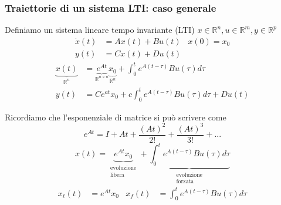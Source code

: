\documentclass{article}
\numberwithin{equation}{subsection}
\begin{document}
\subsubsection{Traiettorie di un sistema LTI: caso generale}
Definiamo un sistema lineare tempo invariante (LTI) $x\in \mathbb{R}^n, u\in \mathbb{R}^m, y\in \mathbb{R}^p$
\begin{align*}
    \dot x(t) &= Ax(t) + Bu(t) &x(0) = x_0\\
    y(t) &= Cx(t) + Du(t)
\end{align*}
\begin{align*}
    \underbrace{x(t)}_{\mathbb{R}^n} &= \underbrace{e^{At}}_{\mathbb{R}^{n \times n}} \underbrace{x_0}_{\mathbb{R}^n} + \int_0^t e^{A(t-\tau)}Bu(\tau) d \tau \\
    y(t) &= Ce^{at}x_0 + c \int_0^t e^{A(t-\tau)}Bu(\tau) d \tau + Du(t)
\end{align*}

Ricordiamo che l'esponenziale di matrice si può scrivere come
\begin{equation}
    e^{At} = I + At + \frac{(At)^2}{2!} + \frac{(At)^3}{3!} + ...
\end{equation}
\begin{equation}
    x(t) = \underbrace{e^{At} x_0}_{\substack{\text{evoluzione} \\ \text{libera}}} + \underbrace{\int_0^t e^{A(t-\tau)}Bu(\tau) d \tau}_{\substack{\text{evoluzione} \\ \text{forzata}}}
\end{equation}
\begin{align*}
    x_\ell(t) &= e^{At}x_0 & x_f(t) &= \int_0^t e^{A(t-\tau)}Bu(\tau) d \tau
\end{align*}
\end{document}
